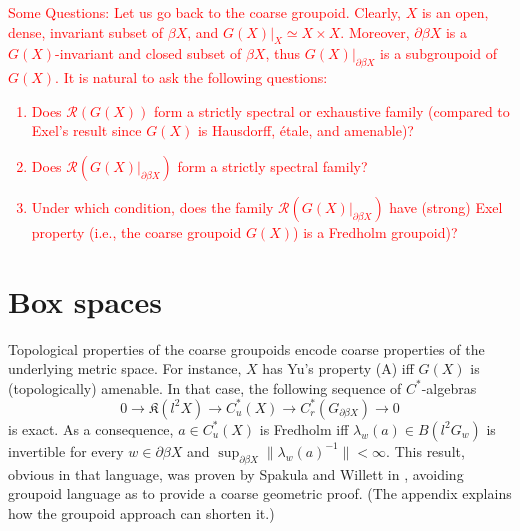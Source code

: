 \documentclass[a4paper]{amsart}
\newcommand\red[1]{\textcolor{red}{#1}}
\newcommand{\maR}{\mathcal R}
\newcommand\<{\langle}
\renewcommand\>{\rangle}
\theoremstyle{definition}
\theoremstyle{remark}
\begin{document}
\smallskip
\red{Some Questions:
Let us go back to the coarse groupoid. Clearly, $X$ is an open, dense, invariant subset of $\beta X$, and $G(X)\big|_{X} \simeq X \times X$.
Moreover, $\partial\beta X$ is a $G(X)$-invariant and closed subset of $\beta X$, thus $G(X)\big|_{\partial \beta X}$ is a subgroupoid of $G(X)$.
It is natural to ask the following questions:
\begin{enumerate}
\item Does $\maR(G(X))$ form a strictly spectral or exhaustive family (compared to Exel's result since $G(X)$ is Hausdorff, \'etale, and amenable)?
\item Does $\maR(G(X)\big|_{\partial \beta X})$ form a strictly spectral family?
\item Under which condition, does the family $\maR(G(X)\big|_{\partial \beta X})$ have (strong) Exel property
(i.e., the coarse groupoid $G(X)$) is a Fredholm groupoid)?
\end{enumerate}
}
\newpage
\section{Box spaces}

Topological properties of the coarse groupoids encode coarse properties of the underlying metric space. For instance, $X$ has Yu's property (A) iff $G(X)$ is (topologically) amenable. In that case, the following sequence of $C^*$-algebras
\[0 \rightarrow \mathfrak K(l^2 X) \rightarrow C^*_u(X) \rightarrow C_r^*(G_{\partial \beta X}) \rightarrow 0\] 
is exact. As a consequence, $a\in C^*_u(X)$ is Fredholm iff $\lambda_w(a)\in B(l^2 G_w)$ is invertible for every $w\in \partial \beta X$ and $\sup_{\partial \beta X} \| \lambda_w (a)^{-1}\| <\infty$. This result, obvious in that language, was proven by Spakula and Willett in \cite{vspakula2017metric}, avoiding groupoid language as to provide a coarse geometric proof. (The appendix explains how the groupoid approach can shorten it.)\\
\end{document}
